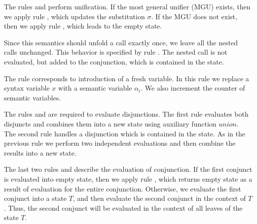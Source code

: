 The rules  and  perform unification. If the most general unifier (MGU) exists, then we apply rule ,
which updates the substitution $\sigma$. If the MGU does not exist, then we apply rule , which leads to the empty state.

Since this semantics should unfold a call exactly once, we leave all the nested calls unchanged. This behavior is specified by rule . The nested call is not evaluated,
but added to the conjunction, which is contained in the state.

The rule  corresponds to introduction of a fresh variable. In this rule we replace a syntax variable $x$ with a semantic variable $\alpha_i$. We also increment
the counter of semantic variables.

The rules  and  are required to evaluate disjunctions. The first rule evaluates both disjuncts and combines them into a new state using auxiliary
function $union$. The second rule handles a disjunction which is contained in the state. As in the previous rule we perform two independent evaluations and then combine the results
into a new state.

The last two rules  and  describe the evaluation of conjunction. If the first conjunct is evaluated into empty state, then we apply rule ,
which returns empty state as a result of evaluation for the entire conjunction. Otherwise, we evaluate the first conjunct into a state $T$, and then evaluate the second conjunct in
the context of $T$. Thus, the second conjunct will be evaluated in the context of all leaves of the state $T$.

